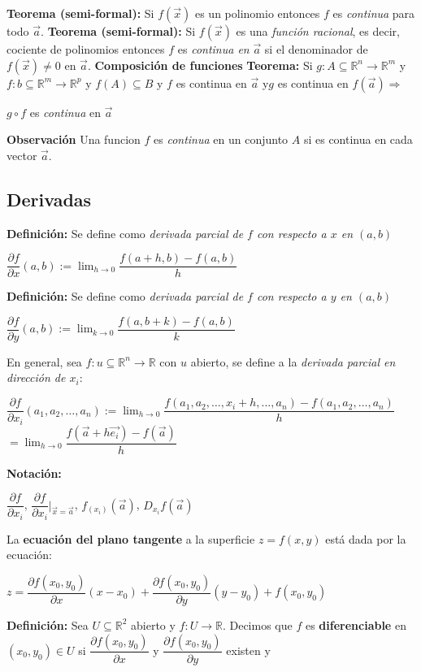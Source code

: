 \documentclass[12pt]{article}
\begin{document}
\noindent\textbf{Teorema (semi-formal):} Si $f(\vec{x})$ es un polinomio entonces $f$ es \emph{continua } para todo $\vec{a}$.\newline
\newline
\noindent\textbf{Teorema (semi-formal):} Si $f(\vec{x})$ es una \emph{función racional}, es decir, cociente de polinomios
entonces $f$ es \emph{continua en} $\vec{a}$ si el denominador de $f(\vec{x})\not=0$ en $\vec{a}$.\newline
\newline
\newpage
\noindent\textbf{Composición de funciones}\newline
\textbf{Teorema: }Si $g:A\subseteq\mathbb{R}^n\rightarrow \mathbb{R}^m$ y $f:b\subseteq\mathbb{R}^m\rightarrow \mathbb{R}^p$ y 
$f(A)\subseteq B$ y $f$ es continua en $\vec{a}$ y$g$ es continua en $f(\vec{a})\Longrightarrow$ 
\begin{center}
    $g\circ f$ es \emph{continua} en $\vec{a}$
\end{center}
\noindent \textbf{Observación} Una funcion $f$ es \emph{continua} en un conjunto $A$ si es continua en cada vector $\vec{a}$.
\newpage
\subsection*{Derivadas}
\noindent \textbf{Definición:} Se define como \emph{derivada parcial de $f$ con respecto a $x$ en $(a,b)$}
\begin{center}
    $\dfrac{\partial f}{\partial x}{(a,b)}:=\lim_{h\rightarrow0}{\dfrac{f(a+h,b)-f(a,b)}{h}}$
\end{center}
\noindent \textbf{Definición:} Se define como \emph{derivada parcial de $f$ con respecto a $y$ en $(a,b)$}
\begin{center}
    $\dfrac{\partial f}{\partial y}{(a,b)}:=\lim_{k\rightarrow0}{\dfrac{f(a,b+k)-f(a,b)}{k}}$
\end{center}
\noindent En general, sea $f:u\subseteq\mathbb{R}^n\rightarrow \mathbb{R}$ con $u$ abierto, 
se define a la \emph{derivada parcial en dirección de $x_i$}: 
\begin{center}
    $\dfrac{\partial f}{\partial x_i}{(a_1,a_2,\dots,a_n)}:=\lim_{h\rightarrow0}{\dfrac{f(a_1,a_2,\dots,x_i+h ,\dots,a_n)-f(a_1,a_2,\dots,a_n)}{h}}$
    \indent $=\lim_{h\rightarrow0}{\dfrac{f(\vec{a}+h\vec{e_i})-f(\vec{a})}{h}}$
\end{center}
\noindent \textbf{Notación: }
\begin{center}
    $\dfrac{\partial f}{\partial x_i}$, $\dfrac{\partial f}{\partial x_i}|_{\vec{x}=\vec{a}}$, $f_{(x_i)}(\vec{a})$, $D_{x_i}f(\vec{a})$
\end{center}
\noindent La \textbf{ecuación del plano tangente} a la superficie $z=f(x,y)$ está dada por la ecuación:
\begin{center}
    $z=\dfrac{\partial f(x_0,y_0)}{\partial x}(x-x_0)+\dfrac{\partial f(x_0,y_0)}{\partial y}(y-y_0)+f(x_0,y_0)$
\end{center}
\noindent \textbf{Definición:} Sea $U\subseteq\mathbb{R}^2$ abierto y $f:U\rightarrow\mathbb{R}$. Decimos que $f$ es 
\textbf{diferenciable} en $(x_0,y_0)\in U$ si $\dfrac{\partial f(x_0,y_0)}{\partial x}$ y $\dfrac{\partial f(x_0,y_0)}{\partial y}$
existen y 
\end{document}
